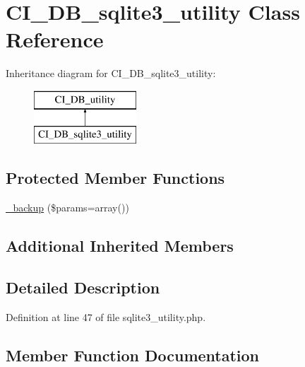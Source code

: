 \hypertarget{class_c_i___d_b__sqlite3__utility}{}\section{C\+I\+\_\+\+D\+B\+\_\+sqlite3\+\_\+utility Class Reference}
\label{class_c_i___d_b__sqlite3__utility}
Inheritance diagram for C\+I\+\_\+\+D\+B\+\_\+sqlite3\+\_\+utility\+:\begin{figure}[H]
\begin{center}
\leavevmode
\includegraphics[height=2.000000cm]{class_c_i___d_b__sqlite3__utility}
\end{center}
\end{figure}
\subsection*{Protected Member Functions}
\begin{DoxyCompactItemize}
\item 
\mbox{\hyperlink{class_c_i___d_b__sqlite3__utility_a30f3053d2c82e7562349924363507afa}{\+\_\+backup}} (\$params=array())
\end{DoxyCompactItemize}
\subsection*{Additional Inherited Members}


\subsection{Detailed Description}


Definition at line 47 of file sqlite3\+\_\+utility.\+php.



\subsection{Member Function Documentation}
\mbox{\label{class_c_i___d_b__sqlite3__utility_a30f3053d2c82e7562349924363507afa}} 
